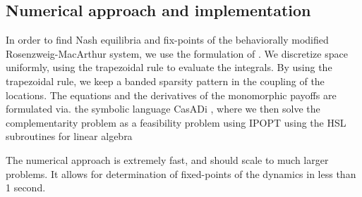\subsection{Numerical approach and implementation}
In order to find Nash equilibria and fix-points of the behaviorally modified Rosenzweig-MacArthur system, we use the formulation of . We discretize space uniformly, using the trapezoidal rule to evaluate the integrals. By using the trapezoidal rule, we keep a banded sparsity pattern in the coupling of the locations. The equations  and the derivatives of the monomorphic payoffs  are formulated via. the symbolic language CasADi \citep{Andersson2019}, where we then solve the complementarity problem as a feasibility problem using IPOPT \citep{wachter2006implementation} using the HSL subroutines for linear algebra \citep{hsl2007collection}

The numerical approach is extremely fast, and should scale to much larger problems. It allows for determination of fixed-points of the dynamics in less than 1 second.




